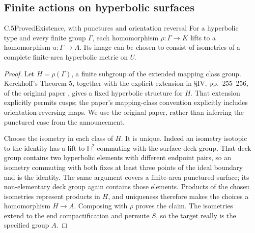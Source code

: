 \subsection{Finite actions on hyperbolic surfaces}

\begin{claim}{C.5}{Proved}{Existence, with punctures and orientation reversal}
For a hyperbolic type and every finite group $\Gamma$, each
homomorphism $\rho:\Gamma\to K$ lifts to a homomorphism
$u:\Gamma\to A$. Its image can be chosen to consist of isometries of a
complete finite-area hyperbolic metric on $U$.
\end{claim}
\begin{proof}
Let $H=\rho(\Gamma)$, a finite subgroup of the extended mapping class
group. Kerckhoff's Theorem 5, together with the explicit extension in
\S IV, pp.~255--256, of the original paper \cite{C_Kerckhoff1983}, gives
a fixed hyperbolic structure for $H$. That extension explicitly permits
cusps; the paper's mapping-class convention explicitly includes
orientation-reversing maps. We use the original paper, rather than
inferring the punctured case from the announcement.

Choose the isometry in each class of $H$. It is unique. Indeed an
isometry isotopic to the identity has a lift to $\mathbb H^2$ commuting
with the surface deck group. That deck group contains two hyperbolic
elements with different endpoint pairs, so an isometry commuting with
both fixes at least three points of the ideal boundary and is the
identity. The same argument covers a finite-area punctured surface;
its non-elementary deck group again contains those elements. Products
of the chosen isometries represent products in $H$, and uniqueness
therefore makes the choices a homomorphism $H\to A$. Composing with
$\rho$ proves the claim. The isometries extend to the end compactification
and permute $S$, so the target really is the specified group $A$.
\end{proof}

